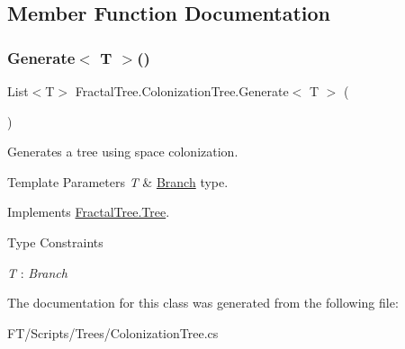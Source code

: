 \subsection{Member Function Documentation}
\mbox{\label{class_fractal_tree_1_1_colonization_tree_ac16d379a8d3c2f2a56ef5e3f1c66df36}} 
\subsubsection{\texorpdfstring{Generate$<$ T $>$()}{Generate< T >()}}
{\footnotesize\ttfamily List$<$T$>$ Fractal\+Tree.\+Colonization\+Tree.\+Generate$<$ T $>$ (\begin{DoxyParamCaption}{ }\end{DoxyParamCaption})}



Generates a tree using space colonization. 


\begin{DoxyTemplParams}{Template Parameters}
{\em T} & \hyperlink{interface_fractal_tree_1_1_branch}{Branch} type.\\
\hline
\end{DoxyTemplParams}


Implements \hyperlink{interface_fractal_tree_1_1_tree}{Fractal\+Tree.\+Tree}.

\begin{Desc}
\item[Type Constraints]\begin{description}
\item[{\em T} : {\em Branch}]\end{description}
\end{Desc}


The documentation for this class was generated from the following file\+:\begin{DoxyCompactItemize}
\item 
F\+T/\+Scripts/\+Trees/Colonization\+Tree.\+cs\end{DoxyCompactItemize}
